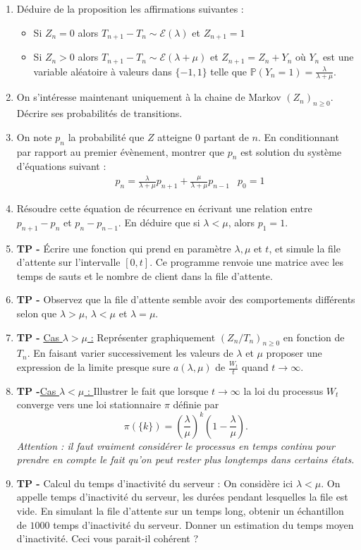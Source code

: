 \documentclass[solutions]{exercices}
\begin{document}
\begin{exercice}
\begin{enumerate}
\item Déduire de la proposition les affirmations suivantes :\begin{itemize}
\item Si $Z_n=0$ alors $T_{n+1}-T_n\sim \mathcal{E}(\lambda)$ et $Z_{n+1}=1$
\item Si $Z_n>0$ alors $T_{n+1}-T_n\sim \mathcal{E}(\lambda+\mu)$ et $Z_{n+1}=Z_n+Y_n$ où $Y_n$ est une variable aléatoire à valeurs dans $\{-1,1\}$ telle que $\mathbb{P}(Y_n=1)=\frac{\lambda}{\lambda+\mu}$.
\end{itemize}
\item On s'intéresse maintenant uniquement à la chaine de Markov $(Z_n)_{n\ge0}$. Décrire ses probabilités de transitions.
\item On note $p_n$ la probabilité que $Z$ atteigne $0$ partant de $n$. En conditionnant par rapport au premier évènement, montrer que $p_n$ est solution du système d'équations suivant :
\begin{align*}
&p_n=\frac{\lambda}{\lambda+\mu}p_{n+1} + \frac{\mu}{\lambda+\mu}p_{n-1}
&p_0=1
\end{align*}
\item Résoudre cette équation de récurrence en écrivant une relation entre $p_{n+1}-p_n$ et $p_n-p_{n-1}$. En déduire que si $\lambda<\mu$, alors $p_1=1$.
\item \textbf{TP -} \'Ecrire une fonction qui prend en paramètre $\lambda, \mu$ et $t$, et simule la file d'attente sur l'intervalle $[0,t]$. Ce programme renvoie une matrice avec les temps de sauts et le nombre de client dans la file d'attente.
\item \textbf{TP -} Observez que la file d'attente semble avoir des comportements différents selon que $\lambda>\mu$, $\lambda<\mu$ et $\lambda=\mu$.
\item \textbf{TP -} \underline{Cas $\lambda>\mu$ :} Représenter graphiquement $(Z_n/T_n)_{n\ge0}$ en fonction de $T_n$. En faisant varier successivement les valeurs de $\lambda$ et $\mu$ proposer une expression de la limite presque sure $a(\lambda, \mu)$ de $\frac{W_t}{t}$ quand $t\to\infty$.
\item \textbf{TP -}\underline{Cas $\lambda<\mu$ : } Illustrer le fait que lorsque $t\to\infty$ la loi du processus $W_t$ converge vers une loi stationnaire $\pi$ définie par $$\pi(\{k\})=\left(\frac\lambda\mu\right)^k\left(1-\frac\lambda\mu\right).$$
\textit{Attention : il faut vraiment considérer le processus en temps continu pour prendre en compte le fait qu'on peut rester plus longtemps dans certains états.}
\item  \textbf{TP -} Calcul du temps d'inactivité du serveur : On considère ici $\lambda<\mu$. On appelle temps d'inactivité du serveur, les durées pendant lesquelles la file est vide. En simulant la file d'attente sur un temps long, obtenir un échantillon de $1000$ temps d'inactivité du serveur. Donner un estimation du temps moyen d'inactivité. Ceci vous parait-il cohérent ?
\end{enumerate}
\end{exercice}
\end{document}
